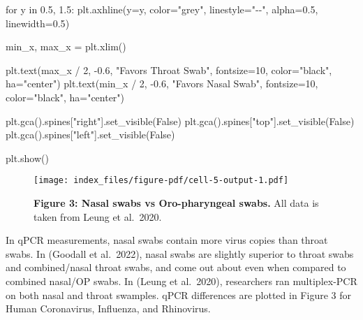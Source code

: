 \documentclass[
  letterpaper,
  DIV=11,
  numbers=noendperiod]{scrartcl}
\newenvironment{Shaded}{\begin{snugshade}}{\end{snugshade}}
\newcommand{\ControlFlowTok}[1]{\textcolor[rgb]{0.00,0.23,0.31}{#1}}
\newcommand{\DecValTok}[1]{\textcolor[rgb]{0.68,0.00,0.00}{#1}}
\newcommand{\FloatTok}[1]{\textcolor[rgb]{0.68,0.00,0.00}{#1}}
\newcommand{\KeywordTok}[1]{\textcolor[rgb]{0.00,0.23,0.31}{#1}}
\newcommand{\NormalTok}[1]{\textcolor[rgb]{0.00,0.23,0.31}{#1}}
\newcommand{\OperatorTok}[1]{\textcolor[rgb]{0.37,0.37,0.37}{#1}}
\newcommand{\StringTok}[1]{\textcolor[rgb]{0.13,0.47,0.30}{#1}}
\newcommand{\VariableTok}[1]{\textcolor[rgb]{0.07,0.07,0.07}{#1}}
\begin{document}
\begin{Shaded}
\begin{Highlighting}[]
\ControlFlowTok{for}\NormalTok{ y }\KeywordTok{in} \FloatTok{0.5}\NormalTok{, }\FloatTok{1.5}\NormalTok{:}
\NormalTok{    plt.axhline(y}\OperatorTok{=}\NormalTok{y, color}\OperatorTok{=}\StringTok{"grey"}\NormalTok{, linestyle}\OperatorTok{=}\StringTok{"{-}{-}"}\NormalTok{, alpha}\OperatorTok{=}\FloatTok{0.5}\NormalTok{, linewidth}\OperatorTok{=}\FloatTok{0.5}\NormalTok{)}

\NormalTok{min\_x, max\_x }\OperatorTok{=}\NormalTok{ plt.xlim()}

\NormalTok{plt.text(max\_x }\OperatorTok{/} \DecValTok{2}\NormalTok{, }\OperatorTok{{-}}\FloatTok{0.6}\NormalTok{, }\StringTok{"Favors Throat Swab"}\NormalTok{, fontsize}\OperatorTok{=}\DecValTok{10}\NormalTok{, color}\OperatorTok{=}\StringTok{"black"}\NormalTok{, ha}\OperatorTok{=}\StringTok{"center"}\NormalTok{)}
\NormalTok{plt.text(min\_x }\OperatorTok{/} \DecValTok{2}\NormalTok{, }\OperatorTok{{-}}\FloatTok{0.6}\NormalTok{, }\StringTok{"Favors Nasal Swab"}\NormalTok{, fontsize}\OperatorTok{=}\DecValTok{10}\NormalTok{, color}\OperatorTok{=}\StringTok{"black"}\NormalTok{, ha}\OperatorTok{=}\StringTok{"center"}\NormalTok{)}

\NormalTok{plt.gca().spines[}\StringTok{"right"}\NormalTok{].set\_visible(}\VariableTok{False}\NormalTok{)}
\NormalTok{plt.gca().spines[}\StringTok{"top"}\NormalTok{].set\_visible(}\VariableTok{False}\NormalTok{)}
\NormalTok{plt.gca().spines[}\StringTok{"left"}\NormalTok{].set\_visible(}\VariableTok{False}\NormalTok{)}

\NormalTok{plt.show()}
\end{Highlighting}
\end{Shaded}

\begin{figure}[H]

{\centering \texttt{[image: index\_files/figure-pdf/cell-5-output-1.pdf]}

}

\caption{\textbf{Figure 3: Nasal swabs vs Oro-pharyngeal swabs.} All
data is taken from Leung et al.~2020.}

\end{figure}%

In qPCR measurements, nasal swabs contain more virus copies than throat
swabs. In (Goodall et al.~2022), nasal swabs are slightly superior to
throat swabs and combined/nasal throat swabs, and come out about even
when compared to combined nasal/OP swabs. In (Leung et al.~2020),
researchers ran multiplex-PCR on both nasal and throat swamples. qPCR
differences are plotted in Figure 3 for Human Coronavirus, Influenza,
and Rhinovirus.
\end{document}
